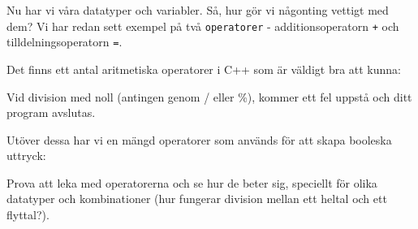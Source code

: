 Nu har vi våra datatyper och variabler. Så, hur gör vi någonting vettigt med dem? Vi har redan sett exempel på två \texttt{operatorer} - additionsoperatorn \texttt{+} och tilldelningsoperatorn \texttt{=}.

Det finns ett antal aritmetiska operatorer i C++ som är väldigt bra att kunna:



Vid division med noll (antingen genom / eller \%), kommer ett fel uppstå och ditt program avslutas.

Utöver dessa har vi en mängd operatorer som används för att skapa booleska uttryck:



Prova att leka med operatorerna och se hur de beter sig, speciellt för olika datatyper och kombinationer (hur fungerar division mellan ett heltal och ett flyttal?).
